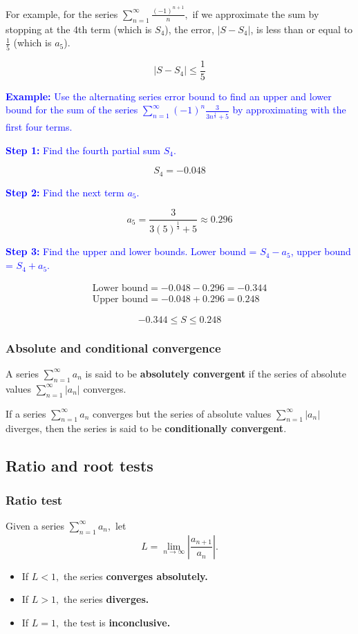 \documentclass[letterpaper, 12pt]{article}
\newcommand{\example}[1]{\textcolor{blue}{\textbf{Example:} #1}}
\newcommand{\step}[2]{\textcolor{blue}{\textbf{Step #1:} #2}}
\begin{document}
For example, for the series $\displaystyle \sum_{n=1}^\infty \frac{(-1)^{n+1}}{n},$ if we approximate the sum by stopping at the 4th term (which is $S_4$), the error, $|S-S_4|$, is less than or equal to $\displaystyle \frac{1}{5}$ (which is $a_5$).

$$|S - S_4| \leq \frac{1}{5}$$

\example{Use the alternating series error bound to find an upper and lower bound for the sum of the series $\displaystyle \sum_{n=1}^{\infty} (-1)^n \frac{3}{3n^\frac{1}{3}+5}$ by approximating with the first four terms.}

\step{1}{Find the fourth partial sum $S_4$.}

$$S_4 = -0.048$$

\step{2}{Find the next term $a_5$.}

$$a_5 = \frac{3}{3(5)^{\frac{1}{3}} + 5} \approx 0.296$$

\step{3}{Find the upper and lower bounds. Lower bound = $S_4 - a_5$, upper bound = $S_4 + a_5$.}

\begin{gather*}
\text{Lower bound} = -0.048 - 0.296 = -0.344 \\
\text{Upper bound} = -0.048 + 0.296 = 0.248
\end{gather*}

$$\boxed{-0.344 \leq S \leq 0.248}$$

\subsubsection*{Absolute and conditional convergence}

A series $\displaystyle \sum_{n=1}^\infty a_n$ is said to be \textbf{absolutely convergent} if the series of absolute values $\displaystyle \sum_{n=1}^\infty |a_n|$ converges.

If a series $\displaystyle \sum_{n=1}^\infty a_n$ converges but the series of absolute values $\displaystyle \sum_{n=1}^\infty |a_n|$ diverges, then the series is said to be \textbf{conditionally convergent}.

\subsection*{Ratio and root tests}

\subsubsection*{Ratio test}
Given a series $\displaystyle \sum_{n=1}^\infty a_n,$ let
$$L = \lim_{n \to \infty} \left| \frac{a_{n+1}}{a_n} \right|.$$
\begin{itemize}
    \item If $L < 1,$ the series \textbf{converges absolutely.}
    \item If $L > 1,$ the series \textbf{diverges.}
    \item If $L = 1,$ the test is \textbf{inconclusive.}
\end{itemize}
\end{document}

